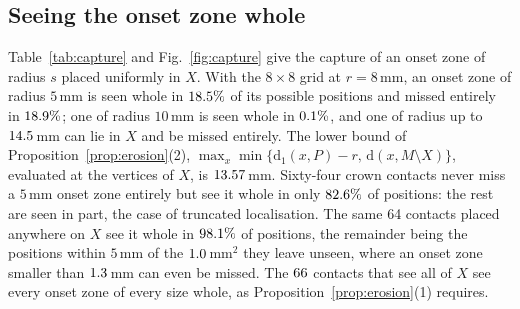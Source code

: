 \documentclass[11pt]{amsart}
\theoremstyle{definition}
\theoremstyle{remark}
\newcommand{\dd}{\mathrm{d}}
\begin{document}
\subsection*{Seeing the onset zone whole}
Table~\ref{tab:capture} and Fig.~\ref{fig:capture} give the capture of an onset
zone of radius $s$ placed uniformly in $X$. With the $8\times8$ grid at
$r=8$\,mm, an onset zone of radius $5$\,mm is seen whole in
$18.5\%$ of its possible positions and missed entirely in
$18.9\%$; one of radius $10$\,mm is seen whole in
$0.1\%$, and one of radius up to $14.5$\,mm can
lie in $X$ and be missed entirely. The lower bound of
Proposition~\ref{prop:erosion}(2), $\max_x\min\{\dd_1(x,P)-r,\,
\dd(x,M\setminus X)\}$, evaluated at the vertices of $X$, is
$13.57$\,mm.
Sixty-four crown contacts never miss a $5$\,mm onset zone entirely but see it
whole in only $82.6\%$ of positions: the rest are seen in
part, the case of truncated localisation. The same 64 contacts placed anywhere
on $X$ see it whole in $98.1\%$ of positions, the
remainder being the positions within $5$\,mm of the $1.0$\,mm$^2$
they leave unseen, where an onset zone smaller than
$1.3$\,mm can even be missed. The $66$ contacts
that see all of $X$ see every onset zone of every size whole, as
Proposition~\ref{prop:erosion}(1) requires.
\end{document}
